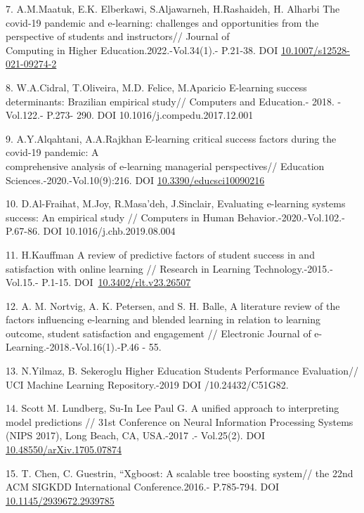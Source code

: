 \begin{references}
7. A.M.Maatuk, E.K. Elberkawi, S.Aljawarneh, H.Rashaideh, H. Alharbi The
covid-19 pandemic and e-learning: challenges and opportunities from the
perspective of students and instructors// Journal of \\Computing in Higher
Education.2022.-Vol.34(1).- P.21-38. DOI
\href{https://doi.org/10.1007/s12528-021-09274-2}{10.1007/s12528-021-09274-2}

8. W.A.Cidral, T.Oliveira, M.D. Felice, M.Aparicio E-learning success
determinants: Brazilian empirical study// Computers and Education.-
2018. -Vol.122.- P.273- 290. DOI 10.1016/j.compedu.2017.12.001

9. A.Y.Alqahtani, A.A.Rajkhan E-learning critical success factors during
the covid-19 pandemic: A \\comprehensive analysis of e-learning managerial
perspectives// Education Sciences.-2020.-Vol.10(9):216. DOI
\href{http://dx.doi.org/10.3390/educsci10090216}{10.3390/educsci10090216}

10. D.Al-Fraihat, M.Joy, R.Masa'deh, J.Sinclair, Evaluating e-learning
systems success: An empirical study // Computers in Human
Behavior.-2020.-Vol.102.-P.67-86. DOI 10.1016/j.chb.2019.08.004

11. H.Kauffman A review of predictive factors of student success in and
satisfaction with online learning // Research in Learning
Technology.-2015.-Vol.15.- P.1-15.
DOI~\href{https://doi.org/10.3402/rlt.v23.26507}{10.3402/rlt.v23.26507}

12. A. M. Nortvig, A. K. Petersen, and S. H. Balle, A literature review
of the factors influencing e-learning and blended learning in relation
to learning outcome, student satisfaction and engagement // Electronic
Journal of e-Learning.-2018.-Vol.16(1).-P.46 - 55.

13. N.Yilmaz, B. Sekeroglu Higher Education Students Performance
Evaluation// UCI Machine Learning Repository.-2019 DOI /10.24432/C51G82.

14. Scott M. Lundberg, Su-In Lee Paul G. A unified approach to
interpreting model predictions // 31st Conference on Neural Information
Processing Systems (NIPS 2017), Long Beach, CA, USA.-2017 .- Vol.25(2).
DOI
\href{http://dx.doi.org/10.48550/arXiv.1705.07874}{10.48550/arXiv.1705.07874}

15. T. Chen, C. Guestrin, ``Xgboost: A scalable tree boosting system//
the 22nd ACM SIGKDD International Conference.2016.- P.785-794. DOI
\href{http://dx.doi.org/10.1145/2939672.2939785}{10.1145/2939672.2939785}
\end{references}

